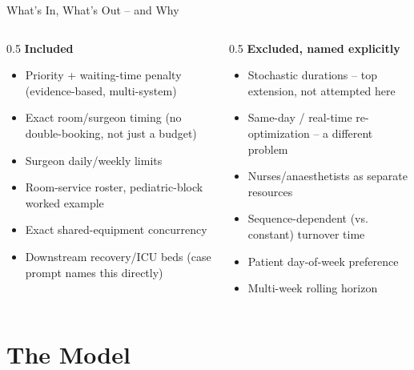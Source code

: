 \documentclass[aspectratio=169]{beamer}
\begin{document}
\begin{frame}{What's In, What's Out -- and Why}
  \footnotesize
  \begin{columns}[T]
    \begin{column}{0.5\textwidth}
      \textbf{\textcolor{ok}{Included}}
      \begin{itemize}
        \item Priority + waiting-time penalty (evidence-based, multi-system)
        \item Exact room/surgeon timing (no double-booking, not just a budget)
        \item Surgeon daily/weekly limits
        \item Room-service roster, pediatric-block worked example
        \item Exact shared-equipment concurrency
        \item Downstream recovery/ICU beds (case prompt names this directly)
      \end{itemize}
    \end{column}
    \begin{column}{0.5\textwidth}
      \textbf{\textcolor{overdue}{Excluded, named explicitly}}
      \begin{itemize}
        \item Stochastic durations -- top extension, not attempted here
        \item Same-day / real-time re-optimization -- a different problem
        \item Nurses/anaesthetists as separate resources
        \item Sequence-dependent (vs. constant) turnover time
        \item Patient day-of-week preference
        \item Multi-week rolling horizon
      \end{itemize}
    \end{column}
  \end{columns}
\end{frame}

\section{The Model}
\end{document}
